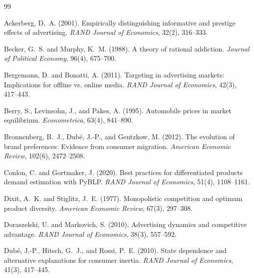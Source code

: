 \documentclass[12pt]{article}
\begin{document}
 \begin{thebibliography}{99}

 Ackerberg, D.~A. (2001).
 \newblock Empirically distinguishing informative and prestige effects of advertising.
 \newblock \emph{RAND Journal of Economics}, 32(2), 316--333.

 Becker, G.~S. and Murphy, K.~M. (1988).
 \newblock A theory of rational addiction.
 \newblock \emph{Journal of Political Economy}, 96(4), 675--700.

 Bergemann, D. and Bonatti, A. (2011).
 \newblock Targeting in advertising markets: Implications for offline vs. online media.
 \newblock \emph{RAND Journal of Economics}, 42(3), 417--443.

 Berry, S., Levinsohn, J., and Pakes, A. (1995).
 \newblock Automobile prices in market equilibrium.
 \newblock \emph{Econometrica}, 63(4), 841--890.

 Bronnenberg, B.~J., Dubé, J.-P., and Gentzkow, M. (2012).
 \newblock The evolution of brand preferences: Evidence from consumer migration.
 \newblock \emph{American Economic Review}, 102(6), 2472--2508.

 Conlon, C. and Gortmaker, J. (2020).
 \newblock Best practices for differentiated products demand estimation with {PyBLP}.
 \newblock \emph{RAND Journal of Economics}, 51(4), 1108--1161.

 Dixit, A.~K. and Stiglitz, J.~E. (1977).
 \newblock Monopolistic competition and optimum product diversity.
 \newblock \emph{American Economic Review}, 67(3), 297--308.

 Doraszelski, U. and Markovich, S. (2010).
 \newblock Advertising dynamics and competitive advantage.
 \newblock \emph{RAND Journal of Economics}, 38(3), 557--592.

 Dubé, J.-P., Hitsch, G.~J., and Rossi, P.~E. (2010).
 \newblock State dependence and alternative explanations for consumer inertia.
 \newblock \emph{RAND Journal of Economics}, 41(3), 417--445.


\end{thebibliography}
\end{document}
